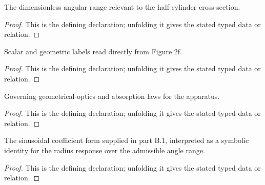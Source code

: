 \begin{definition}[IsAdmissibleIncidenceAngle]
  \label{decl:physics:IPhO_2026_2_B_1:IsAdmissibleIncidenceAngle}
  The dimensionless angular range relevant to the half-cylinder cross-section.
\end{definition}
\begin{proof}
  This is the defining declaration; unfolding it gives the stated typed data or relation.
\end{proof}

\begin{definition}
  \label{decl:physics:IPhO_2026_2_B_1:Figure2fReadout}
  Scalar and geometric labels read directly from Figure 2f.
\end{definition}
\begin{proof}
  This is the defining declaration; unfolding it gives the stated typed data or relation.
\end{proof}

\begin{definition}[ValidSolarCookerPhysics]
  \label{decl:physics:IPhO_2026_2_B_1:ValidSolarCookerPhysics}
  Governing geometrical-optics and absorption laws for the apparatus.
\end{definition}
\begin{proof}
  This is the defining declaration; unfolding it gives the stated typed data or relation.
\end{proof}

\begin{definition}[IsRadiusCoefficientFormula]
  \label{decl:physics:IPhO_2026_2_B_1:IsRadiusCoefficientFormula}
  The sinusoidal coefficient form supplied in part B.1, interpreted as a symbolic identity for the radius response over the admissible angle range.
\end{definition}
\begin{proof}
  This is the defining declaration; unfolding it gives the stated typed data or relation.
\end{proof}


